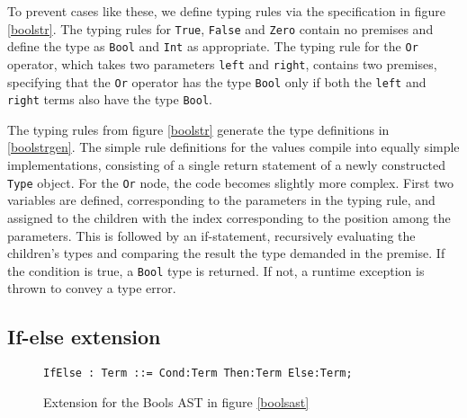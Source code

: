 \documentclass[nofilelist]{cslthse-msc}
\begin{document}
To prevent cases like these, we define typing rules via the specification in figure \ref{boolstr}.
The typing rules for \verb|True|, \verb|False| and \verb|Zero| contain no premises and define the type as \verb|Bool| and \verb|Int| as appropriate.
The typing rule for the \verb|Or| operator, which takes two parameters \verb|left| and \verb|right|, contains two premises, specifying that the \verb|Or| operator has the type \verb|Bool| only if both the \verb|left| and \verb|right| terms also have the type \verb|Bool|.

The typing rules from figure \ref{boolstr} generate the type definitions in \ref{boolstrgen}.
The simple rule definitions for the values compile into equally simple implementations, consisting of a single return statement of a newly constructed \verb|Type| object.
For the \verb|Or| node, the code becomes slightly more complex.
First two variables are defined, corresponding to the parameters in the typing rule, and assigned to the children with the index corresponding to the position among the parameters.
This is followed by an if-statement, recursively evaluating the children's types and comparing the result the type demanded in the premise.
If the condition is true, a \verb|Bool| type is returned.
If not, a runtime exception is thrown to convey a type error.

\subsection{If-else extension}

\begin{figure}[h]
\begin{lstlisting}[]
IfElse : Term ::= Cond:Term Then:Term Else:Term;
\end{lstlisting}
  \caption{Extension for the Bools AST in figure \ref{boolsast}}
  \label{ifelseast}
\end{figure}
\end{document}
